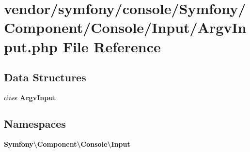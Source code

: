 \section{vendor/symfony/console/\+Symfony/\+Component/\+Console/\+Input/\+Argv\+Input.php File Reference}
\label{_argv_input_8php}
\subsection*{Data Structures}
\begin{DoxyCompactItemize}
\item 
class {\bf Argv\+Input}
\end{DoxyCompactItemize}
\subsection*{Namespaces}
\begin{DoxyCompactItemize}
\item 
 {\bf Symfony\textbackslash{}\+Component\textbackslash{}\+Console\textbackslash{}\+Input}
\end{DoxyCompactItemize}
